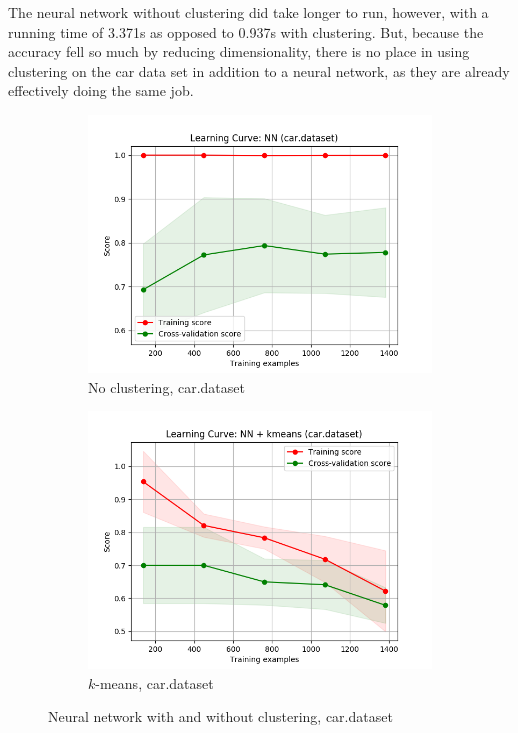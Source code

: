 \documentclass{article}
\begin{document}
    The neural network without clustering did take longer to run, however, with a running time of 3.371s as opposed to 0.937s with clustering. But, because the accuracy fell so much by reducing dimensionality, there is no place in using clustering on the car data set in addition to a neural network, as they are already effectively doing the same job.

    \begin{figure}[htb]
    \centering

      \begin{subfigure}{0.5\textwidth}
        \includegraphics[width=\linewidth]{out/nn_cluster/car-learning.png}
        \caption{No clustering, car.dataset}
      \end{subfigure}\hfil
      \begin{subfigure}{0.5\textwidth}
        \includegraphics[width=\linewidth]{out/nn_cluster/car-kmeans-learning.png}
        \caption{$k$-means, car.dataset}
      \end{subfigure}

    \caption{Neural network with and without clustering, car.dataset}
    \label{fig:nnc-plot-car}
    \end{figure}
\end{document}

